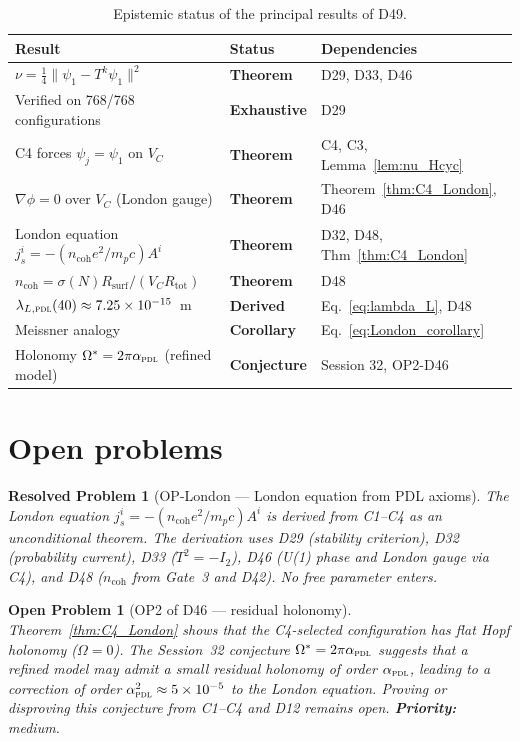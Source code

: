 \documentclass[12pt,a4paper]{article}
\newtheorem{openproblem}{Open Problem}
\newtheorem{resolvedproblem}{Resolved Problem}
\newcommand{\PDL}{\textsc{pdl}}
\newcommand{\Rsurf}{R_{\mathrm{surf}}}
\newcommand{\Rtot}{R_{\mathrm{tot}}}
\newcommand{\VC}{V_C}
\newcommand{\sig}{\sigma}
\newcommand{\ncoh}{n_{\mathrm{coh}}}
\begin{document}
\begin{table}[H]
\centering
\caption{Epistemic status of the principal results of D49.}
\label{tab:epistemic}
\small
\begin{tabular}{p{7.5cm}p{3.5cm}p{2.5cm}}
\toprule
Result & Status & Dependencies \\
\midrule
$\nu = \tfrac{1}{4}\|\psi_1 - T^k\psi_1\|^2$ & \textbf{Theorem} & D29, D33, D46 \\
Verified on 768/768 configurations & \textbf{Exhaustive} & D29 \\
C4 forces $\psi_j = \psi_1$ on $V_C$ & \textbf{Theorem} & C4, C3, Lemma~\ref{lem:nu_Hcyc} \\
$\nabla\phi = 0$ over $V_C$ (London gauge) & \textbf{Theorem} & Theorem~\ref{thm:C4_London}, D46 \\
London equation $j^i_s = -(\ncoh e^2/m_p c)A^i$ & \textbf{Theorem} & D32, D48, Thm~\ref{thm:C4_London} \\
$\ncoh = \sig(N)\Rsurf/(\VC\Rtot)$ & \textbf{Theorem} & D48 \\
$\lambda_{L,\PDL}(40) \approx 7.25\times10^{-15}$~m & \textbf{Derived} & Eq.~\eqref{eq:lambda_L}, D48 \\
Meissner analogy & \textbf{Corollary} & Eq.~\eqref{eq:London_corollary} \\
\midrule
Holonomy $\Omega^* = 2\pi\alpha_{\PDL}$ (refined model) & \textbf{Conjecture} & Session 32, OP2-D46 \\
\bottomrule
\end{tabular}
\end{table}

\section{Open problems}
\label{sec:open}

\begin{resolvedproblem}[OP-London --- London equation from PDL axioms]
The London equation $j^i_s = -(\ncoh e^2/m_p c)A^i$ is derived from C1--C4 as an unconditional theorem. The derivation uses D29 (stability criterion), D32 (probability current), D33 ($T^2 = -I_2$), D46 (U(1) phase and London gauge via C4), and D48 ($\ncoh$ from Gate~3 and D42). No free parameter enters.
\end{resolvedproblem}

\begin{openproblem}[OP2 of D46 --- residual holonomy]
\label{op:holonomy}
Theorem~\ref{thm:C4_London} shows that the C4-selected configuration has flat Hopf holonomy ($\Omega = 0$). The Session~32 conjecture $\Omega^* = 2\pi\alpha_{\PDL}$ suggests that a refined model may admit a small residual holonomy of order $\alpha_{\PDL}$, leading to a correction of order $\alpha_{\PDL}^2 \approx 5\times10^{-5}$ to the London equation. Proving or disproving this conjecture from C1--C4 and D12 remains open. \textbf{Priority:} medium.
\end{openproblem}
\end{document}
